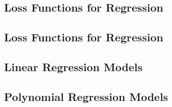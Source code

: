 

\subsection{Loss Functions for Regression}


\subsection{Loss Functions for Regression}


\subsection{Linear Regression Models}


\subsection{Polynomial Regression Models}
